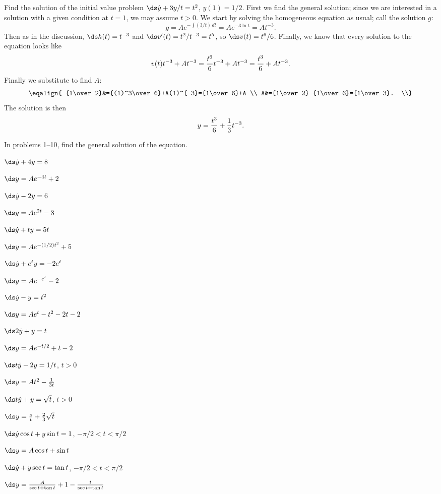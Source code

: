 \begin{example} Find the solution of the initial value problem
$\ds \dot y+3y/t=t^2$, $y(1)=1/2$. First we find the general solution;
since we are interested in a solution with a given condition at $t=1$,
we may assume $t>0$.
We start by solving the homogeneous equation as usual; call the
solution $g$:
$$g=Ae^{-\int (3/t)\,dt}=Ae^{-3\ln t}=At^{-3}.$$
Then as in the discussion, $\ds h(t)=t^{-3}$ and
$\ds v'(t)=t^2/t^{-3}=t^5$, so $\ds v(t)=t^6/6$. Finally, we know that
every solution to the equation looks like
$$v(t)t^{-3}+At^{-3}={t^6\over6}t^{-3}+At^{-3}={t^3\over6}+At^{-3}.$$
Finally we substitute to find $A$:
$$\eqalign{
{1\over 2}&={(1)^3\over6}+A(1)^{-3}={1\over6}+A \\
A&={1\over 2}-{1\over6}={1\over3}. \\}
$$
The solution is then
$$y={t^3\over6}+{1\over3}t^{-3}.$$
\end{example}

\begin{exercises}

In problems 1--10, find the general solution of the equation.

\exercise $\ds\dot y +4y=8$
\begin{answer} $\ds y=Ae^{-4t}+2$
\end{answer}

\exercise $\ds\dot y-2y=6$
\begin{answer} $\ds y=Ae^{2t}-3$
\end{answer}

\exercise $\ds\dot y +ty=5t$
\begin{answer} $\ds y=Ae^{-(1/2)t^2}+5$
\end{answer}

\exercise $\ds\dot y+e^ty=-2e^t$
\begin{answer} $\ds y=Ae^{-e^t}-2$
\end{answer}

\exercise $\ds\dot y-y=t^2$
\begin{answer} $\ds y=Ae^{t}-t^2-2t-2$
\end{answer}

\exercise $\ds 2\dot y +y=t$
\begin{answer} $\ds y=Ae^{-t/2}+t-2$
\end{answer}

\exercise $\ds t\dot y -2y=1/t$, $t>0$
\begin{answer} $\ds y=At^2-{1\over3t}$
\end{answer}

\exercise $\ds t\dot y+y=\sqrt{t}$, $t>0$
\begin{answer} $\ds y={c\over t}+{2\over3}\sqrt t$
\end{answer}

\exercise $\ds\dot y\cos t+y\sin t=1$, $-\pi/2<t<\pi/2$
\begin{answer} $\ds y= A\cos t+\sin t$
\end{answer}

\exercise $\ds\dot y + y\sec t=\tan t$, $-\pi/2<t<\pi/2$
\begin{answer} $\ds y= {A\over\sec t+\tan t}+1-{t\over\sec t+\tan t}$
\end{answer}

\end{exercises}
